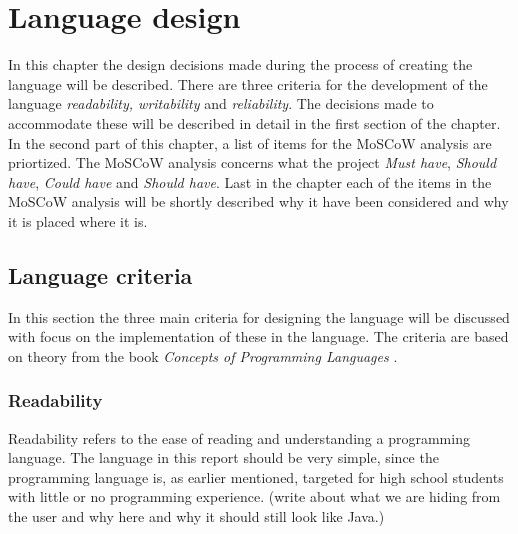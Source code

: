 \chapter{Language design}
\label{chap:LanguageDesign}
In this chapter the design decisions made during the process of creating the language will be described. There are three criteria for the development of the language \emph{readability, writability} and \emph{reliability}. The decisions made to accommodate these will be described in detail in the first section of the chapter. In the second part of this chapter, a list of items for the MoSCoW analysis are priortized. The MoSCoW analysis concerns what the project \textit{Must have}, \textit{Should have}, \textit{Could have} and \textit{Should have}. Last in the chapter each of the  items in the MoSCoW analysis will be shortly described why it have been considered and why it is placed where it is.
 
\section{Language criteria}

In this section the three main criteria for designing the language will be discussed with focus on the implementation of these in the language. The criteria are based on theory from the book \emph{Concepts of Programming Languages} \citep{Sebesta}.

\subsection{Readability}
Readability refers to the ease of reading and understanding a programming language. The language in this report should be very simple, since the programming language is, as earlier mentioned, targeted for high school students with little or no programming experience. (write about what we are hiding from  the user and why here and why it should still look like Java.)


